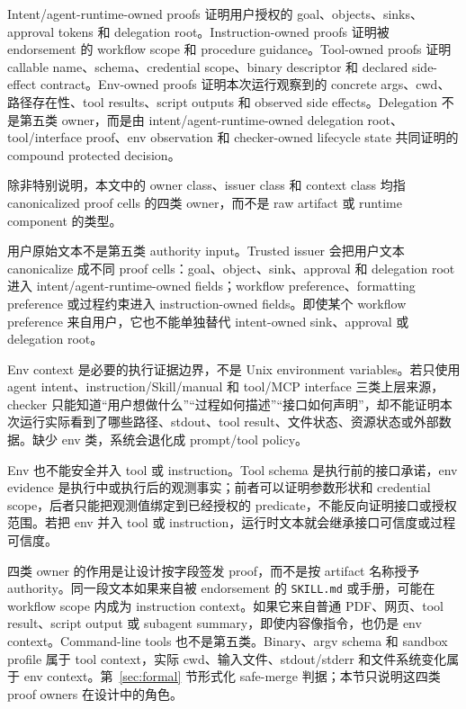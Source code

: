 \documentclass[UTF8,a4paper,11pt]{ctexart}
\begin{document}
Intent/agent-runtime-owned proofs 证明用户授权的 goal、objects、sinks、approval tokens 和 delegation root。Instruction-owned proofs 证明被 endorsement 的 workflow scope 和 procedure guidance。Tool-owned proofs 证明 callable name、schema、credential scope、binary descriptor 和 declared side-effect contract。Env-owned proofs 证明本次运行观察到的 concrete args、cwd、路径存在性、tool results、script outputs 和 observed side effects。Delegation 不是第五类 owner，而是由 intent/agent-runtime-owned delegation root、tool/interface proof、env observation 和 checker-owned lifecycle state 共同证明的 compound protected decision。

除非特别说明，本文中的 owner class、issuer class 和 context class 均指 canonicalized proof cells 的四类 owner，而不是 raw artifact 或 runtime component 的类型。

用户原始文本不是第五类 authority input。Trusted issuer 会把用户文本 canonicalize 成不同 proof cells：goal、object、sink、approval 和 delegation root 进入 intent/agent-runtime-owned fields；workflow preference、formatting preference 或过程约束进入 instruction-owned fields。即使某个 workflow preference 来自用户，它也不能单独替代 intent-owned sink、approval 或 delegation root。

Env context 是必要的执行证据边界，不是 Unix environment variables。若只使用 agent intent、instruction/Skill/manual 和 tool/MCP interface 三类上层来源，checker 只能知道“用户想做什么”“过程如何描述”“接口如何声明”，却不能证明本次运行实际看到了哪些路径、stdout、tool result、文件状态、资源状态或外部数据。缺少 env 类，系统会退化成 prompt/tool policy。

Env 也不能安全并入 tool 或 instruction。Tool schema 是执行前的接口承诺，env evidence 是执行中或执行后的观测事实；前者可以证明参数形状和 credential scope，后者只能把观测值绑定到已经授权的 predicate，不能反向证明接口或授权范围。若把 env 并入 tool 或 instruction，运行时文本就会继承接口可信度或过程可信度。

四类 owner 的作用是让设计按字段签发 proof，而不是按 artifact 名称授予 authority。同一段文本如果来自被 endorsement 的 \texttt{SKILL.md} 或手册，可能在 workflow scope 内成为 instruction context。如果它来自普通 PDF、网页、tool result、script output 或 subagent summary，即使内容像指令，也仍是 env context。Command-line tools 也不是第五类。Binary、argv schema 和 sandbox profile 属于 tool context，实际 cwd、输入文件、stdout/stderr 和文件系统变化属于 env context。第~\ref{sec:formal} 节形式化 safe-merge 判据；本节只说明这四类 proof owners 在设计中的角色。
\end{document}
